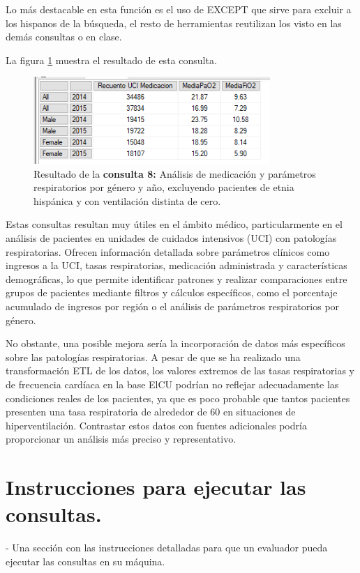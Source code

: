 \documentclass[12pt, a4paper, twoside]{article}
\begin{document}
	Lo más destacable en esta función es el uso de EXCEPT que sirve para excluir a los hispanos de la búsqueda, el resto de herramientas reutilizan los visto en las demás consultas o en clase.
	
	La figura \ref{fig:consulta8} muestra el resultado de esta consulta.
	
	\begin{figure}[H]
		\centering
		\includegraphics[width=0.8\textwidth]{image/consulta8.png}
		\caption{Resultado de la \textbf{consulta 8:} Análisis de medicación y parámetros respiratorios por género y año, excluyendo pacientes de etnia hispánica y con ventilación distinta de cero.}
		\label{fig:consulta8}
	\end{figure}
	
	
Estas consultas resultan muy útiles en el ámbito médico, particularmente en el análisis de pacientes en unidades de cuidados intensivos (UCI) con patologías respiratorias. Ofrecen información detallada sobre parámetros clínicos como ingresos a la UCI, tasas respiratorias, medicación administrada y características demográficas, lo que permite identificar patrones y realizar comparaciones entre grupos de pacientes mediante filtros y cálculos específicos, como el porcentaje acumulado de ingresos por región o el análisis de parámetros respiratorios por género.

No obstante, una posible mejora sería la incorporación de datos más específicos sobre las patologías respiratorias. A pesar de que se ha realizado una transformación ETL de los datos, los valores extremos de las tasas respiratorias y de frecuencia cardíaca en la base ElCU podrían no reflejar adecuadamente las condiciones reales de los pacientes, ya que es poco probable que tantos pacientes presenten una tasa respiratoria de alrededor de 60 en situaciones de hiperventilación. Contrastar estos datos con fuentes adicionales podría proporcionar un análisis más preciso y representativo.
	
	
	\section{Instrucciones para ejecutar las consultas.}
	- Una sección con las instrucciones detalladas para que un evaluador pueda ejecutar las consultas en su máquina. 
	
\end{document}
